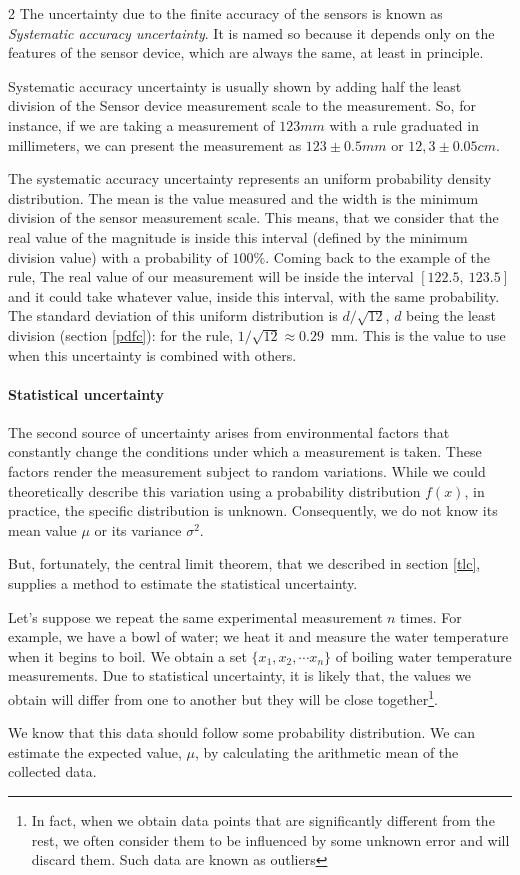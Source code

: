 \begin{paracol}{2}
The uncertainty due to the finite accuracy of the sensors is known as \emph{Systematic accuracy uncertainty}. It is named so because it depends only on the features of the sensor device, which are always the same, at least in principle. 

Systematic accuracy uncertainty is usually shown by adding half the least division of the Sensor device measurement scale to the measurement. So, for instance, if we are taking a measurement of $123 mm$ with a rule graduated in millimeters, we can present the measurement as  $123 \pm 0.5 mm$ or $12,3\pm0.05cm$.

The systematic accuracy uncertainty represents an uniform probability density distribution. The mean is the value measured and the width is the minimum division of the sensor measurement scale. This means, that we consider that the real value of the magnitude is inside this interval (defined by the minimum division value) with a probability of $100\%$. Coming back to the example of the rule, The real value of our measurement will be inside the interval $[122.5,\ 123.5 ]$ and it could take whatever value, inside this interval, with the same probability. The standard deviation of this uniform distribution is $d/\sqrt{12}$, $d$ being the least division (section \ref{pdfc}): for the rule, $1/\sqrt{12}\approx 0.29$~mm. This is the value to use when this uncertainty is combined with others.

\paragraph{Statistical uncertainty}
The second source of uncertainty arises from environmental factors that constantly change the conditions under which a measurement is taken. These factors render the measurement subject to random variations. While we could theoretically describe this variation using a probability distribution $f(x)$, in practice, the specific distribution is unknown. Consequently, we do not know its mean value $\mu$ or its variance $\sigma^2$.

But, fortunately, the central limit theorem, that we described in section \ref{tlc}, supplies a method to estimate the statistical uncertainty.

Let's suppose we repeat the same experimental measurement $n$ times. For example, we have a bowl of water; we heat it and measure the water temperature when it begins to boil. We obtain a set $\{x_1,x_2,\cdots x_n\}$ of boiling water temperature measurements. Due to statistical uncertainty, it is likely that,  the values we obtain will differ from one to another but they will be close together\footnote{In fact, when we obtain data points that are significantly different from the rest, we often consider them to be influenced by some unknown error and will discard them. Such data are known as outliers}.

We know that this data should follow some probability distribution. We can estimate the expected value, $\mu$, by calculating the arithmetic mean of the collected data.
\end{paracol}

